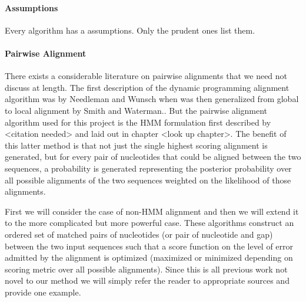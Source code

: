 \documentclass[11pt]{article}
\begin{document}
\paragraph{Assumptions}
\par{
Every algorithm has a assumptions. Only the prudent ones list them.

}



\paragraph{Pairwise Alignment\newline}
\par{
There exists a considerable literature on pairwise alignments that we need not discuss at length. The first description of the dynamic programming alignment algorithm was by Needleman and Wunsch\cite{NeedlemanWunsch} when was then generalized from global to local alignment by Smith and Waterman.\cite{SmithWaterman}. But the pairwise alignment algorithm used for this project is the HMM formulation first described by <citation needed> and laid out in \cite{Durbin} chapter <look up chapter>. The benefit of this latter method is that not just the single highest scoring alignment is generated, but for every pair of nucleotides that could be aligned between the two sequences, a probability is generated representing the posterior probability over all possible alignments of the two sequences weighted on the likelihood of those alignments. 
}
\par{
First we will consider the case of non-HMM alignment and then we will extend it to the more complicated but more powerful case. These algorithms construct an ordered set of matched pairs of nucleotides (or pair of nucleotide and gap) between the two input sequences such that a score function on the level of error admitted by the alignment is optimized (maximized or minimized depending on scoring metric over all possible alignments).  Since this is all previous work not novel to our method we will simply refer the reader to appropriate sources and provide one example.}
\end{document}
